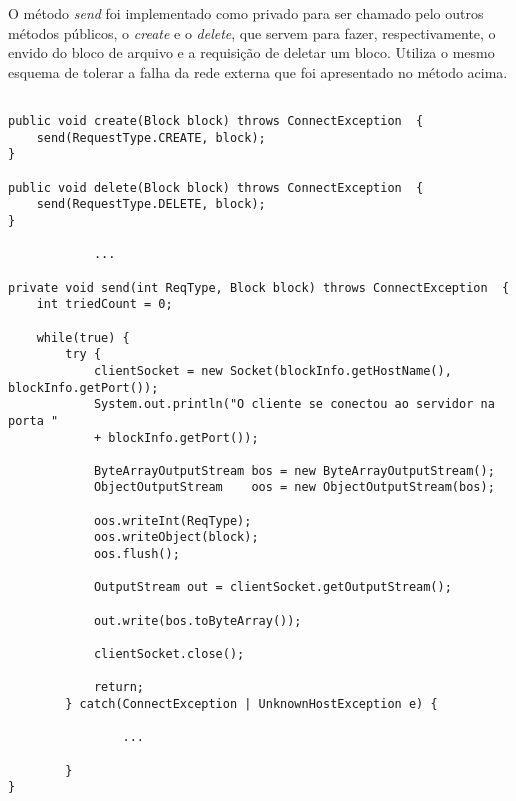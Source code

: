 O método \textit{send} foi implementado como privado para ser chamado pelo outros métodos públicos, o \textit{create} e o \textit{delete}, que servem para fazer, respectivamente, o envido do bloco de arquivo e a requisição de deletar um bloco.
Utiliza o mesmo esquema de tolerar a falha da rede externa que foi apresentado no método acima.

\begin{lstlisting}[basicstyle=\ttfamily\footnotesize, frame=single]	

public void create(Block block) throws ConnectException  {
	send(RequestType.CREATE, block);
}

public void delete(Block block) throws ConnectException  {
	send(RequestType.DELETE, block);
}

			...

private void send(int ReqType, Block block) throws ConnectException  {
	int triedCount = 0;
	
	while(true) {
		try {
			clientSocket = new Socket(blockInfo.getHostName(), blockInfo.getPort());
			System.out.println("O cliente se conectou ao servidor na porta " 
			+ blockInfo.getPort());
			
			ByteArrayOutputStream bos = new ByteArrayOutputStream();
			ObjectOutputStream    oos = new ObjectOutputStream(bos);
			
			oos.writeInt(ReqType);
			oos.writeObject(block);
			oos.flush();
			
			OutputStream out = clientSocket.getOutputStream();
			
			out.write(bos.toByteArray());
			
			clientSocket.close();
			
			return;
		} catch(ConnectException | UnknownHostException e) {
		
				...
				
		}
}
\end{lstlisting}

